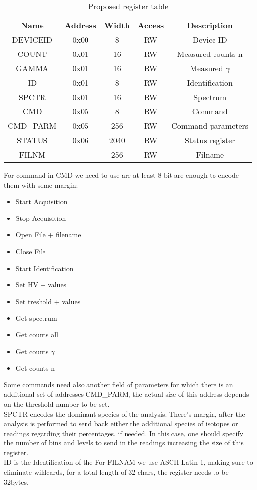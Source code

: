 \documentclass{article}
\begin{document}
\begin{table}[h]
    \centering
    \begin{tabular}{c|c|c|c|c}
        \textbf{Name} & \textbf{Address} & \textbf{Width} & \textbf{Access} & \textbf{Description}\\
        DEVICEID & 0x00  &  8    & RW     &   Device ID\\
        COUNT & 0x01  &  16    & RW     &   Measured counts n\\
        GAMMA    & 0x01  &  16    & RW     &  Measured $\gamma$ \\
        ID       & 0x01 & 8 & RW & Identification\\
        SPCTR    & 0x01  &  16   & RW      & Spectrum\\
        CMD     & 0x05  &  8    & RW    &   Command\\
        CMD\_PARM & 0x05   &  256 & RW      & Command parameters\\
        STATUS     & 0x06  &  2040    & RW      &   Status register\\
        FILNM  &       &  256  & RW     &   Filname\\

    \end{tabular}
    \caption{Proposed register table}
    \label{tab:reg_tab}
\end{table}



For command in CMD we need to use are at least 8 bit are enough to encode them with some margin:
\begin{itemize}
    \item Start Acquisition
    \item Stop Acquisition
    \item Open File + filename
    \item Close File
    \item Start Identification
    \item Set HV +  values
    \item Set treshold + values
    \item Get spectrum
    \item Get counts all
    \item Get counts $\gamma$
    \item Get counts n
\end{itemize}

Some commands need also another field of parameters for which there is an additional set of addresses CMD\_PARM, the actual 
size of this address depends on the threshold number to be set.\\
SPCTR encodes the dominant species of the analysis. There's margin, after the analysis is performed to send back either the additional species
of isotopes or readings regarding their percentages, if needed. In this case, one should specify the number of bins and levels
to send in the readings increasing the size of this register.\\
ID is the Identification of the 
For FILNAM we use ASCII Latin-1, making sure to eliminate wildcards, for a total length of 32 chars, the register needs to be 32bytes.
\end{document}
